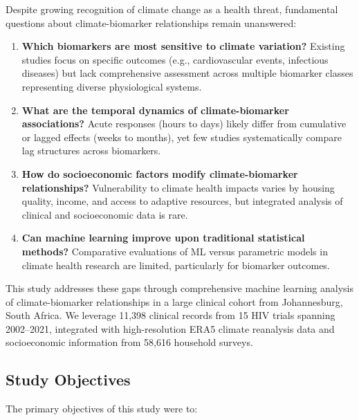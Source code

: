 Despite growing recognition of climate change as a health threat, fundamental questions about climate-biomarker relationships remain unanswered:

\begin{enumerate}
    \item \textbf{Which biomarkers are most sensitive to climate variation?} Existing studies focus on specific outcomes (e.g., cardiovascular events, infectious diseases) but lack comprehensive assessment across multiple biomarker classes representing diverse physiological systems.

    \item \textbf{What are the temporal dynamics of climate-biomarker associations?} Acute responses (hours to days) likely differ from cumulative or lagged effects (weeks to months), yet few studies systematically compare lag structures across biomarkers.

    \item \textbf{How do socioeconomic factors modify climate-biomarker relationships?} Vulnerability to climate health impacts varies by housing quality, income, and access to adaptive resources, but integrated analysis of clinical and socioeconomic data is rare.

    \item \textbf{Can machine learning improve upon traditional statistical methods?} Comparative evaluations of ML versus parametric models in climate health research are limited, particularly for biomarker outcomes.
\end{enumerate}

This study addresses these gaps through comprehensive machine learning analysis of climate-biomarker relationships in a large clinical cohort from Johannesburg, South Africa. We leverage 11,398 clinical records from 15 HIV trials spanning 2002--2021, integrated with high-resolution ERA5 climate reanalysis data and socioeconomic information from 58,616 household surveys.

\subsection{Study Objectives}

The primary objectives of this study were to:

